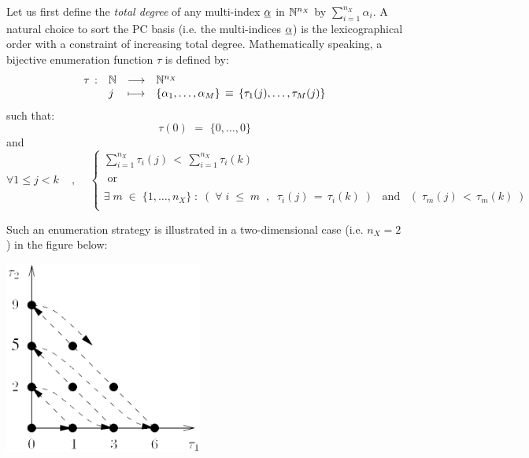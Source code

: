 {Let us first define the \emph{total degree} of any multi-index $\underline{\alpha}$ in $\mathbb{N}^{n_X}$ by $\sum_{i=1}^{n_X} \alpha_i$. A natural choice to sort the PC basis (i.e. the multi-indices $\underline{\alpha}$) is the lexicographical order with a constraint of increasing total degree. Mathematically speaking, a bijective enumeration function $\tau$ is defined by:
\begin{equation}
 \begin{array}{llcl}
 \tau \, : & {\mathbb N} & \longrightarrow & \mathbb{N}^{n_X} \\
           &  j & \longmapsto & \{\alpha_1,\dots, \alpha_M\} \, \equiv \, \{\tau_1(j),\dots,\tau_M(j)\} \\
\end{array}
\end{equation}
such that:
\begin{equation}
\tau(0) \, \, = \, \, \{0,\dots,0\}
\end{equation}
and
\begin{equation}
\forall 1 \leq j<k  \quad \, , \quad \, \left\{
\begin{array}{l}
\displaystyle{\sum_{i=1}^{n_X} \tau_i(j) \, < \,  \sum_{i=1}^{n_X} \tau_i(k)  }  \\
\\
\mbox{ or} \\
\\
\displaystyle{\exists \; m \; \in \; \{1,\dots,n_X\} \; : \; \left( \; \forall \; i \; \leq \; m \; \; , \; \; \tau_i(j) \, = \, \tau_i(k) \; \right) \, \, \, \mbox{ and } \, \, \, \left( \; \tau_m(j) \, < \, \tau_m(k) \; \right)} \\
\end{array}
\right.
\end{equation}


Such an enumeration strategy is illustrated in a two-dimensional case (i.e. $n_X=2$) in the figure below:

\begin{center}		\includegraphics[width = 6.5cm]{enumerate.png} \end{center} 

}
